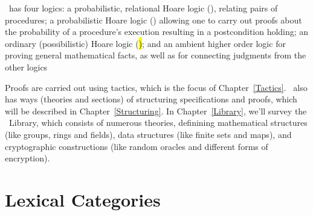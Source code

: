 \EasyCrypt\ has four logics: a probabilistic, relational Hoare logic
(\prhl), relating pairs of procedures; a probabilistic Hoare logic
(\phl) allowing one to carry out proofs about the probability of a
procedure's execution resulting in a postcondition holding; an
ordinary (possibilistic) Hoare logic (\hl); and an ambient higher
order logic for proving general mathematical facts, as well as for
connecting judgments from the other logics

Proofs are carried out using tactics, which is the focus of
Chapter~\ref{Tactics}.  \EasyCrypt\ also has ways (theories and
sections) of structuring specifications and proofs, which will be
described in Chapter~\ref{Structuring}. In Chapter~\ref{Library},
we'll survey the \EasyCrypt\ Library, which consists of numerous
theories, definining mathematical structures (like groups, rings
and fields), data structures (like finite sets and maps), and
cryptographic constructions (like random oracles and different
forms of encryption).

\section{Lexical Categories}

